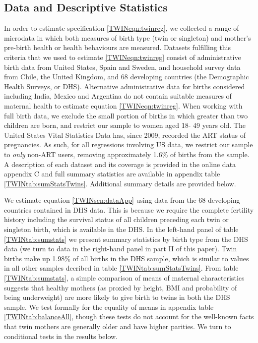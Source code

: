 \documentclass[subeqn]{article}
\begin{document}
\begin{spacing}{1.4}
\section{Data and Descriptive Statistics}              \label{TWINscn:data}
In order to estimate specification \ref{TWINeqn:twinreg}, we collected a range
of microdata in which both measures of birth type (twin or singleton) and
mother's pre-birth health or health behaviours are measured.  Datasets
fulfilling this criteria that we used to estimate \ref{TWINeqn:twinreg} consist
of administrative birth data from United States, Spain and Sweden, and household
survey data from Chile, the United Kingdom, and 68 developing countries (the
Demographic Health Surveys, or DHS).  Alternative administrative data for
births considered including India, Mexico and Argentina do not contain suitable
measures of maternal health to estimate equation \ref{TWINeqn:twinreg}.  When
working with full birth data, we exclude the small portion of births in which
greater than two children are born, and restrict our sample to women aged 18-%
49 years old. The United States Vital Statistics Data has, since 2009,
recorded the ART status of pregnancies.  As such, for all regressions
involving US data, we restrict our sample to \emph{only} non-ART users, removing
approximately 1.6\% of births from the sample.  A description of each dataset
and its coverage is provided in the online data appendix C and full summary
statistics are available in appendix table \ref{TWINtab:sumStatsTwins}.
Additional summary details are provided below.

We estimate equation \ref{TWINscn:dataApp} using data from the 68 developing
countries contained in DHS data.  This is because we require the complete
fertility history including the survival status of all children preceding each
twin or singleton birth, which is available in the DHS.  In the left-hand panel
of table \ref{TWINtab:sumstats} we present summary statistics by birth type
from the DHS data (we turn to data in the right-hand panel in part II of this
paper). Twin births make up 1.98\% of all births
in the DHS sample, which is similar to values in all other samples decribed in
table \ref{TWINtab:sumStatsTwins}. From table \ref{TWINtab:sumstats}, a
simple comparison of means of maternal characteristics suggests that healthy
mothers (as proxied by height, BMI and probability of being underweight) are
more likely to give birth to twins in both the DHS sample. We test formally for
the equality of means in appendix table \ref{TWINtab:balanceAll}, though these
tests do not account for the well-known facts that twin mothers are generally
older and have higher parities.  We turn to conditional tests in the results
below.


\end{spacing}
\end{document}
